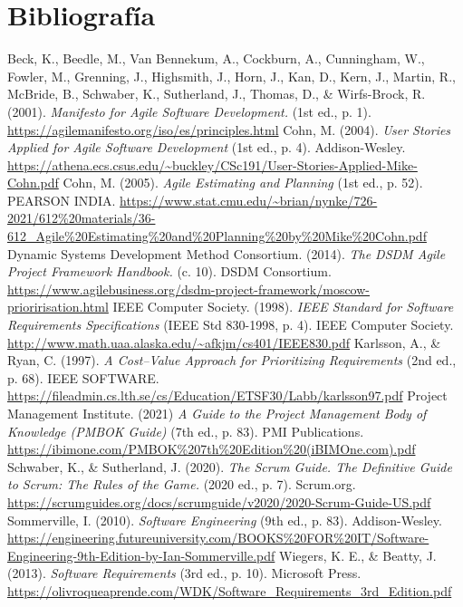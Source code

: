 \section*{Bibliografía}

\begin{thebibliography}{99}
Beck, K., Beedle, M., Van Bennekum, A., Cockburn, A., Cunningham, W., Fowler, M., Grenning, J., Highsmith, J., Horn, J., Kan, D., Kern, J., Martin, R., McBride, B., Schwaber, K., Sutherland, J., Thomas, D., \& Wirfs-Brock, R. (2001).
\textit{Manifesto for Agile Software Development.} (1st ed., p. 1).
\url{https://agilemanifesto.org/iso/es/principles.html}
Cohn, M. (2004).
\textit{User Stories Applied for Agile Software Development} (1st ed., p. 4).
Addison-Wesley.
\url{https://athena.ecs.csus.edu/~buckley/CSc191/User-Stories-Applied-Mike-Cohn.pdf}
Cohn, M. (2005).
\textit{Agile Estimating and Planning} (1st ed., p. 52).
PEARSON INDIA.
\url{https://www.stat.cmu.edu/~brian/nynke/726-2021/612%20materials/36-612_Agile%20Estimating%20and%20Planning%20by%20Mike%20Cohn.pdf}
Dynamic Systems Development Method Consortium. (2014).
\textit{The DSDM Agile Project Framework Handbook.} (c. 10).
DSDM Consortium.
\url{https://www.agilebusiness.org/dsdm-project-framework/moscow-prioririsation.html}
IEEE Computer Society. (1998).
\textit{IEEE Standard for Software Requirements Specifications} (IEEE Std 830-1998, p. 4).
IEEE Computer Society.
\url{http://www.math.uaa.alaska.edu/~afkjm/cs401/IEEE830.pdf}
Karlsson, A., \& Ryan, C. (1997).
\textit{A Cost–Value Approach for Prioritizing Requirements} (2nd ed., p. 68).
IEEE SOFTWARE.
\url{https://fileadmin.cs.lth.se/cs/Education/ETSF30/Labb/karlsson97.pdf}
Project Management Institute. (2021)
\textit{A Guide to the Project Management Body of Knowledge (PMBOK Guide)} (7th ed., p. 83).
PMI Publications.
\url{https://ibimone.com/PMBOK%207th%20Edition%20(iBIMOne.com).pdf}
Schwaber, K., \& Sutherland, J. (2020).
\textit{The Scrum Guide. The Definitive Guide to Scrum: The Rules of the Game.} (2020 ed., p. 7).
Scrum.org.
\url{https://scrumguides.org/docs/scrumguide/v2020/2020-Scrum-Guide-US.pdf}
Sommerville, I. (2010).
\textit{Software Engineering} (9th ed., p. 83).
Addison-Wesley.
\url{https://engineering.futureuniversity.com/BOOKS%20FOR%20IT/Software-Engineering-9th-Edition-by-Ian-Sommerville.pdf}
Wiegers, K. E., \& Beatty, J. (2013).
\textit{Software Requirements} (3rd ed., p. 10).
Microsoft Press.
\url{https://olivroqueaprende.com/WDK/Software_Requirements_3rd_Edition.pdf}
\end{thebibliography}